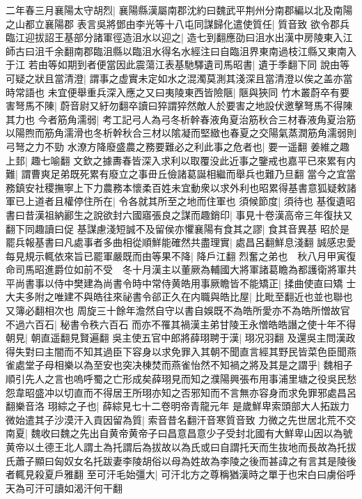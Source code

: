二年春三月襄陽太守胡烈|{
	襄陽縣漢屬南郡沈約曰魏武平荆州分南郡編以北及南陽之山都立襄陽郡}
表言吳將鄧由李光等十八屯同謀歸化遣使質任|{
	質音致}
欲令郡兵臨江迎拔詔王基部分諸軍徑造沮水以迎之|{
	造七到翻應劭曰沮水出漢中房陵東入江師古曰沮千余翻南郡臨沮縣以臨沮水得名水經注曰自臨沮界東南過枝江縣又東南入于江}
若由等如期到者便當因此震蕩江表基馳驛遺司馬昭書|{
	遺于季翻下同}
說由等可疑之狀且當清澄|{
	謂事之虚實未定如水之混濁莫測其淺深且當清澄以俟之盖亦當時常語也}
未宜便舉重兵深入應之又曰夷陵東西皆險陿|{
	陿與狹同}
竹木叢蔚卒有要害弩馬不陳|{
	蔚音尉又紆勿翻卒讀曰猝謂猝然敵人於要害之地設伏邀擊弩馬不得陳其力也}
今者筋角濡弱|{
	考工記弓人為弓冬析幹春液角夏治筋秋合三材春液角夏治筋以陽煦而筋角濡滑也冬析幹秋合三材以隂凝而堅緻也春夏之交陽氣蒸潤筋角濡弱則弓弩之力不勁}
水潦方降廢盛農之務要難必之利此事之危者也|{
	要一遥翻}
姜維之趣上邽|{
	趣七喻翻}
文欽之據夀春皆深入求利以取覆没此近事之鑒戒也嘉平已來累有内難|{
	謂曹爽足弟既死累有廢立之事毌丘儉諸葛誕相繼而舉兵也難乃旦翻}
當今之宜當務鎮安社稷撫寧上下力農務本懷柔百姓未宜動衆以求外利也昭累得基書意狐疑敕諸軍已上道者且權停住所在|{
	令各就其所至之地而住軍也}
須候節度|{
	須待也}
基復遺昭書曰昔漢祖納酈生之說欲封六國寤張良之謀而趣銷印|{
	事見十卷漢高帝三年復扶又翻下同趣讀曰促}
基謀慮淺短誠不及留侯亦懼襄陽有食其之謬|{
	食其音異基}
昭於是罷兵報基書曰凡處事者多曲相從順鮮能確然共盡理實|{
	處昌呂翻鮮息淺翻}
誠感忠愛每見規示輒依來旨已罷軍嚴既而由等果不降|{
	降戶江翻}
烈奮之弟也　秋八月甲寅復命司馬昭進爵位如前不受　冬十月漢主以董厥為輔國大將軍諸葛瞻為都護衛將軍共平尚書事以侍中樊建為尚書令時中常侍黄皓用事厥瞻皆不能矯正|{
	揉曲使直曰矯}
士大夫多附之唯建不與皓往來祕書令郤正久在内職與皓比屋|{
	比毗至翻近也並也聯也又簿必翻相次也}
周旋三十餘年澹然自守以書自娛既不為皓所愛亦不為皓所憎故官不過六百石|{
	秘書令秩六百石}
而亦不罹其禍漢主弟甘陵王永憎皓皓譖之使十年不得朝見|{
	朝直遥翻見賢遍翻}
吳主使五官中郎將薛珝聘于漢|{
	珝况羽翻}
及還吳主問漢政得失對曰主闇而不知其過臣下容身以求免罪入其朝不聞直言經其野民皆菜色臣聞燕雀處堂子母相樂以為至安也突决棟焚而燕雀怡然不知禍之將及其是之謂乎|{
	魏相子順引先人之言也嗚呼蜀之亡形成矣薛珝見而知之濮陽興張布用事浦里塘之役吳民愁怨韋昭盛冲以切直而不得居王所珝亦知之否邪知而不言無亦容身而求免罪邪處昌呂翻樂音洛}
珝綜之子也|{
	薛綜見七十二卷明帝青龍元年}
是歲鮮卑索頭部大人拓跋力微始遣其子沙漠汗入貢因留為質|{
	索音昔名翻汗音寒質音致}
力微之先世居北荒不交南夏|{
	魏收曰魏之先出自黄帝黄帝子曰昌意昌意少子受封北國有大鮮卑山因以為號黄帝以土德王北人謂土為托謂后為拔故以為氏或曰自謂托天而生抜地而長故為托拔氏蕭子顯曰匈奴女名托跋妻李陵胡俗以母為姓故為李陵之後而甚諱之有言其是陵後者輒見殺夏戶雅翻}
至可汗毛始彊大|{
	可汗北方之尊稱猶漢時之單于也宋白曰虜俗呼天為可汗可讀如渴汗何干翻}
